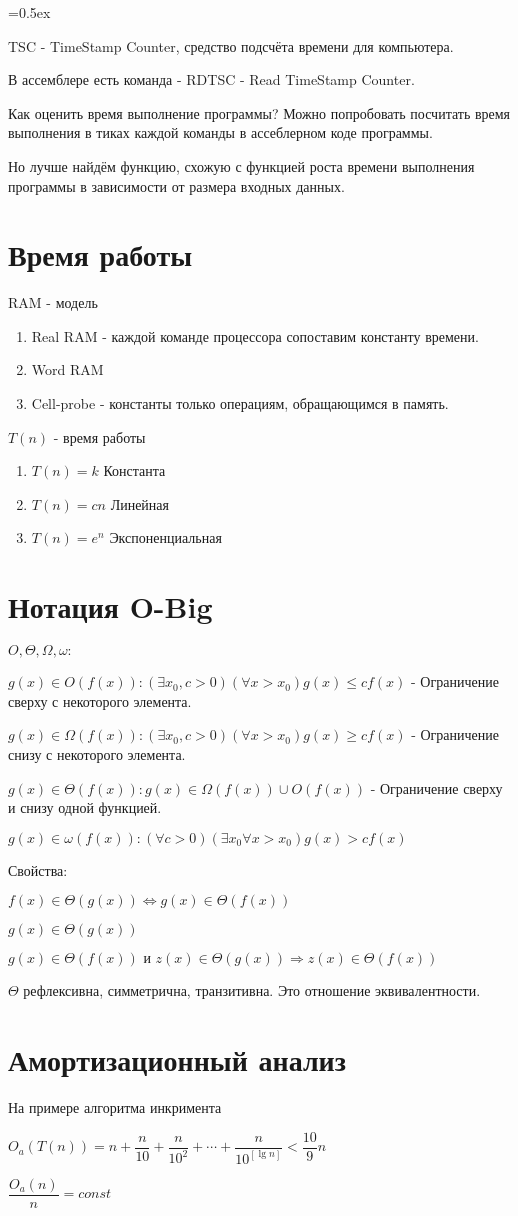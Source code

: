 \documentclass[a4paper,12pt]{article}
\begin{document}
\parskip=0.5ex

\par
TSC - TimeStamp Counter, средство подсчёта времени для компьютера.
\par
В ассемблере есть команда - RDTSC - Read TimeStamp Counter.
\par
Как оценить время выполнение программы? Можно попробовать посчитать время выполнения в тиках каждой команды в ассеблерном коде программы.
\par
Но лучше найдём функцию, схожую с функцией роста времени выполнения программы в зависимости от размера входных данных.

\section{Время работы}
RAM - модель
\begin{enumerate}
	\item Real RAM - каждой команде процессора сопоставим константу времени.
	\item Word RAM
	\item Cell-probe - константы только операциям, обращающимся в память.
\end{enumerate}
$T(n)$ - время работы
\begin{enumerate}
\item $T(n) = k$ Константа
\item $T(n) = cn$ Линейная
\item $T(n) = e^n$ Экспоненциальная
\end{enumerate}
\section{Нотация O-Big}
$O, \Theta, \Omega, \omega:$

$g(x) \in O(f(x)): (\exists  x_0, c > 0) (\forall x > x_0) g(x) \leq c f(x)$ - Ограничение сверху с некоторого элемента.

$g(x) \in \Omega(f(x)): (\exists  x_0, c > 0) (\forall x > x_0) g(x) \geq c f(x)$ - Ограничение снизу с некоторого элемента.

$g(x) \in \Theta(f(x)): g(x) \in \Omega(f(x)) \cup  O(f(x))$ - Ограничение сверху и снизу одной функцией.

$g(x) \in \omega(f(x)): (\forall c > 0) (\exists x_0 \forall x > x_0) g(x) > c f(x)$ 

Свойства:

$f(x) \in \Theta(g(x)) \Leftrightarrow g(x) \in \Theta(f(x))$

$g(x) \in \Theta(g(x))$

$g(x) \in \Theta(f(x)) \text{ и }
z(x) \in \Theta(g(x)) \Rightarrow 
z(x) \in \Theta(f(x))$

$\Theta$ рефлексивна, симметрична, транзитивна. Это отношение эквивалентности.

\section{Амортизационный анализ}
На примере алгоритма инкримента

$O_a(T(n)) = n + \dfrac{n}{10} + \dfrac{n}{10^2} + \cdots + \dfrac{n}{10^{[\lg{n}]}} < \dfrac{10}{9} n$

$\dfrac{O_a(n)}{n} = const$
\end{document}
